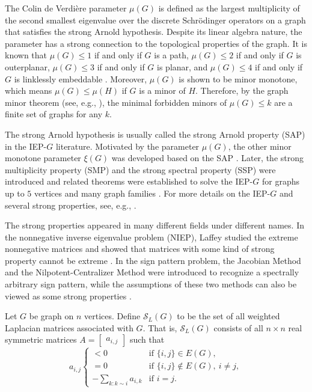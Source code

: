 \documentclass{article}
\theoremstyle{definition}
\newcommand{\mptn}{\mathcal{S}}
\begin{document}
The Colin de Verdi\`ere parameter $\mu(G)$ is defined as the largest multiplicity of the second smallest eigenvalue over the discrete Schr\"odinger operators on a graph that satisfies the strong Arnold hypothesis.  Despite its linear algebra nature, the parameter has a strong connection to the topological properties of the graph.  It is known that $\mu(G) \leq 1$ if and only if $G$ is a path, $\mu(G) \leq 2$ if and only if $G$ is outerplanar, $\mu(G) \leq 3$ if and only if $G$ is planar, and $\mu(G) \leq 4$ if and only if $G$ is linklessly embeddable \cite{CdV,CdVF,KLV}.  Moreover, $\mu(G)$ is shown to be minor monotone, which means $\mu(G) \leq \mu(H)$ if $G$ is a minor of $H$.  Therefore, by the graph minor theorem (see, e.g., \cite{DiestelGT}), the minimal forbidden minors of $\mu(G) \leq k$ are a finite set of graphs for any $k$.

The strong Arnold hypothesis is usually called the strong Arnold property (SAP) in the IEP-$G$ literature.  Motivated by the parameter $\mu(G)$, the other minor monotone parameter $\xi(G)$ was developed based on the SAP \cite{BFH3}.  Later, the strong multiplicity property (SMP) and the strong spectral property (SSP) were introduced and related theorems were established to solve the IEP-$G$ for graphs up to $5$ vertices and many graph families \cite{gSAP,IEPG2,bifur}.  For more details on the IEP-$G$ and several strong properties, see, e.g., \cite{IEPGZF22,CGSV25,CS20,ACFLS24}.

The strong properties appeared in many different fields under different names.  In the nonnegative inverse eigenvalue problem (NIEP), Laffey studied the extreme nonnegative matrices and showed that matrices with some kind of strong property cannot be extreme \cite{Laffey98}.  In the sign pattern problem, the Jacobian Method and the Nilpotent-Centralizer Method were introduced to recognize a spectrally arbitrary sign pattern, while the assumptions of these two methods can also be viewed as some strong properties \cite{DJOvdD00,BMOvdD04,GB12,GB13}.  


Let $G$ be graph on $n$ vertices. Define $\mptn_L(G)$ to be the set of all weighted Laplacian matrices associated with $G$. That is, $\mptn_L(G)$ consists of all $n\times n$ real symmetric matrices $A = \begin{bmatrix} a_{i,j} \end{bmatrix}$ such that 
\[
    a_{i,j} \begin{cases}
    < 0 & \text{if } \{i,j\}\in E(G), \\
    = 0 & \text{if } \{i,j\}\notin E(G),\ i\neq j, \\
    - \sum_{k: k\sim i}a_{i,k} & \text{if } i = j.
    \end{cases}
\]
\end{document}
